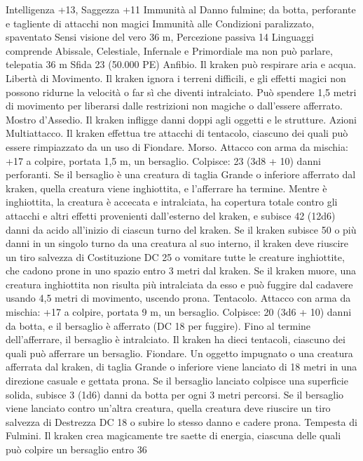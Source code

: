 \begin{multicols}{2}
Intelligenza +13, Saggezza +11
Immunità al Danno fulmine; da botta, perforante e tagliente
di attacchi non magici
Immunità alle Condizioni paralizzato, spaventato
Sensi visione del vero 36 m, Percezione passiva 14
Linguaggi comprende Abissale, Celestiale, Infernale e
Primordiale ma non può parlare, telepatia 36 m
Sfida 23 (50.000 PE)
Anfibio. Il kraken può respirare aria e acqua.
Libertà di Movimento. Il kraken ignora i terreni difficili, e gli
effetti magici non possono ridurne la velocità o far sì che diventi
intralciato. Può spendere 1,5 metri di movimento per liberarsi
dalle restrizioni non magiche o dall’essere afferrato.
Mostro d’Assedio. Il kraken infligge danni doppi agli oggetti e le
strutture.
Azioni
Multiattacco. Il kraken effettua tre attacchi di tentacolo, ciascuno
dei quali può essere rimpiazzato da un uso di Fiondare.
Morso. Attacco con arma da mischia: +17 a colpire, portata 1,5
m, un bersaglio.
Colpisce: 23 (3d8 + 10) danni perforanti. Se il bersaglio è una
creatura di taglia Grande o inferiore afferrato dal kraken, quella
creatura viene inghiottita, e l’afferrare ha termine. Mentre è
inghiottita, la creatura è accecata e intralciata, ha copertura totale
contro gli attacchi e altri effetti provenienti dall’esterno del
kraken, e subisce 42 (12d6) danni da acido all’inizio di ciascun
turno del kraken.
Se il kraken subisce 50 o più danni in un singolo turno da una
creatura al suo interno, il kraken deve riuscire un tiro salvezza di
Costituzione DC 25 o vomitare tutte le creature inghiottite, che
cadono prone in uno spazio entro 3 metri dal kraken. Se il kraken
muore, una creatura inghiottita non risulta più intralciata da esso
e può fuggire dal cadavere usando 4,5 metri di movimento,
uscendo prona.
Tentacolo. Attacco con arma da mischia: +17 a colpire, portata 9
m, un bersaglio.
Colpisce: 20 (3d6 + 10) danni da botta, e il bersaglio è
afferrato (DC 18 per fuggire). Fino al termine dell’afferrare, il
bersaglio è intralciato. Il kraken ha dieci tentacoli, ciascuno dei
quali può afferrare un bersaglio.
Fiondare. Un oggetto impugnato o una creatura afferrata dal
kraken, di taglia Grande o inferiore viene lanciato di 18 metri in
una direzione casuale e gettata prona. Se il bersaglio lanciato
colpisce una superficie solida, subisce 3 (1d6) danni da botta
per ogni 3 metri percorsi. Se il bersaglio viene lanciato contro
un’altra creatura, quella creatura deve riuscire un tiro salvezza di
Destrezza DC 18 o subire lo stesso danno e cadere prona.
Tempesta di Fulmini. Il kraken crea magicamente tre saette di
energia, ciascuna delle quali può colpire un bersaglio entro 36

\end{multicols}
